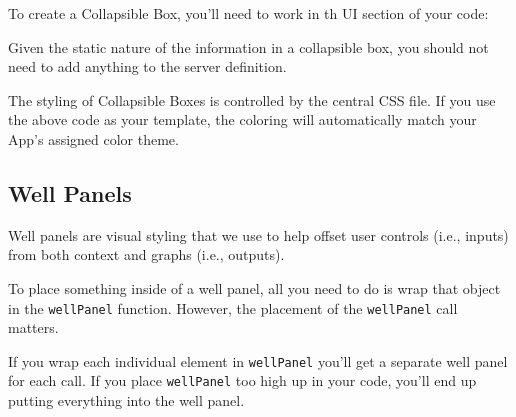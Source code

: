 \documentclass[
]{book}
\newenvironment{Shaded}{\begin{snugshade}}{\end{snugshade}}
\newcommand{\CommentTok}[1]{\textcolor[rgb]{0.56,0.35,0.01}{\textit{#1}}}
\newcommand{\DataTypeTok}[1]{\textcolor[rgb]{0.13,0.29,0.53}{#1}}
\newcommand{\KeywordTok}[1]{\textcolor[rgb]{0.13,0.29,0.53}{\textbf{#1}}}
\newcommand{\NormalTok}[1]{#1}
\newcommand{\OtherTok}[1]{\textcolor[rgb]{0.56,0.35,0.01}{#1}}
\newcommand{\StringTok}[1]{\textcolor[rgb]{0.31,0.60,0.02}{#1}}
\begin{document}
To create a Collapsible Box, you'll need to work in th UI section of your code:

\begin{Shaded}
\end{Shaded}

Given the static nature of the information in a collapsible box, you should not need to add anything to the server definition.

The styling of Collapsible Boxes is controlled by the central CSS file. If you use the above code as your template, the coloring will automatically match your App's assigned color theme.

\hypertarget{well-panels}{%
\subsection{Well Panels}\label{well-panels}}

Well panels are visual styling that we use to help offset user controls (i.e., inputs) from both context and graphs (i.e., outputs).

To place something inside of a well panel, all you need to do is wrap that object in the \texttt{wellPanel} function. However, the placement of the \texttt{wellPanel} call matters.

If you wrap each individual element in \texttt{wellPanel} you'll get a separate well panel for each call. If you place \texttt{wellPanel} too high up in your code, you'll end up putting everything into the well panel.
\end{document}
